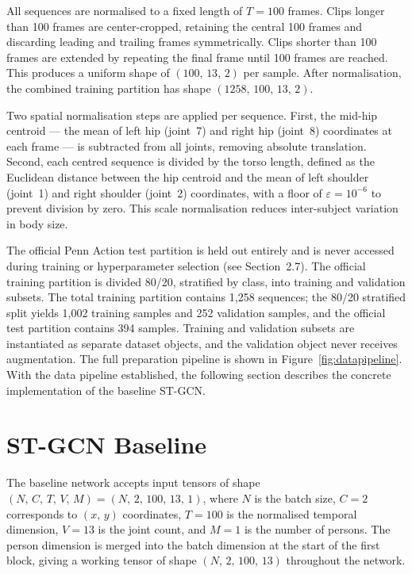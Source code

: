 All sequences are normalised to a fixed length of $T = 100$ frames. Clips longer than 100 frames are center-cropped, retaining the central 100 frames and discarding leading and trailing frames symmetrically. Clips shorter than 100 frames are extended by repeating the final frame until 100 frames are reached. This produces a uniform shape of $(100,\,13,\,2)$ per sample. After normalisation, the combined training partition has shape $(1258,\,100,\,13,\,2)$.

Two spatial normalisation steps are applied per sequence. First, the mid-hip centroid --- the mean of left hip (joint~7) and right hip (joint~8) coordinates at each frame --- is subtracted from all joints, removing absolute translation. Second, each centred sequence is divided by the torso length, defined as the Euclidean distance between the hip centroid and the mean of left shoulder (joint~1) and right shoulder (joint~2) coordinates, with a floor of $\varepsilon = 10^{-6}$ to prevent division by zero. This scale normalisation reduces inter-subject variation in body size.

The official Penn Action test partition is held out entirely and is never accessed during training or hyperparameter selection (see Section~2.7). The official training partition is divided 80/20, stratified by class, into training and validation subsets. The total training partition contains 1{,}258 sequences; the 80/20 stratified split yields 1{,}002 training samples and 252 validation samples, and the official test partition contains 394 samples. Training and validation subsets are instantiated as separate dataset objects, and the validation object never receives augmentation. The full preparation pipeline is shown in Figure~\ref{fig:datapipeline}. With the data pipeline established, the following section describes the concrete implementation of the baseline ST-GCN.

\section{ST-GCN Baseline}
\label{sec:baseline}

The baseline network accepts input tensors of shape $(N,\,C,\,T,\,V,\,M) = (N,\,2,\,100,\,13,\,1)$, where $N$ is the batch size, $C = 2$ corresponds to $(x,\,y)$ coordinates, $T = 100$ is the normalised temporal dimension, $V = 13$ is the joint count, and $M = 1$ is the number of persons. The person dimension is merged into the batch dimension at the start of the first block, giving a working tensor of shape $(N,\,2,\,100,\,13)$ throughout the network.

